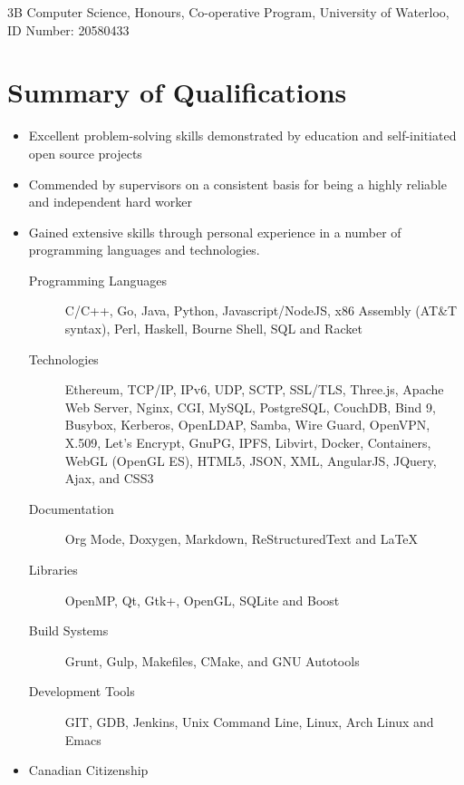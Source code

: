 \documentclass[11pt,letterpaper]{moderncv}
\newenvironment{coverletter}[2][Recruitment team]{%
  \recipient{#1}{#2}%
  \opening{Dear Sir or Madam,}%
  \closing{Sincerely,}%
  \enclosure{R\'esum\'e}%
  \makelettertitle%
}{%
  \makeletterclosing%
  \clearpage%
}
\begin{document}
\newif\ifincludeletter
\ifincludeletter
\begin{coverletter}{Company, Inc.\\123 somestreet\\some city}
  \lipsum[1-3]
\end{coverletter}
\fi

\makecvtitle

3B Computer Science, Honours, Co-operative Program, University of
Waterloo, ID Number: 20580433

\section{Summary of Qualifications}

\begin{itemize}
\item Excellent problem-solving skills demonstrated by education
  and self-initiated open source projects
\item Commended by supervisors on a consistent basis for being a
  highly reliable and independent hard worker
\item Gained extensive skills through personal experience in a number
  of programming languages and technologies.
  \begin{description}
  \item[Programming Languages] C/C++, Go, Java, Python,
    Javascript/NodeJS, x86 Assembly (AT\&T syntax), Perl, Haskell,
    Bourne Shell, SQL and Racket
  \item[Technologies] Ethereum, TCP/IP, IPv6, UDP, SCTP, SSL/TLS,
    Three.js, Apache Web Server, Nginx, CGI, MySQL, PostgreSQL,
    CouchDB, Bind 9, Busybox, Kerberos, OpenLDAP, Samba, Wire Guard,
    OpenVPN, X.509, Let's Encrypt, GnuPG, IPFS, Libvirt, Docker,
    Containers, WebGL (OpenGL ES), HTML5, JSON, XML, AngularJS,
    JQuery, Ajax, and CSS3
  \item[Documentation] Org Mode, Doxygen, Markdown, ReStructuredText
    and \LaTeX{}
  \item[Libraries] OpenMP, Qt, Gtk+, OpenGL, SQLite and Boost
  \item[Build Systems] Grunt, Gulp, Makefiles, CMake, and GNU Autotools
  \item[Development Tools] GIT, GDB, Jenkins, Unix Command Line,
    Linux, Arch Linux and Emacs
  \end{description}
\item Canadian Citizenship
\end{itemize}
\end{document}

